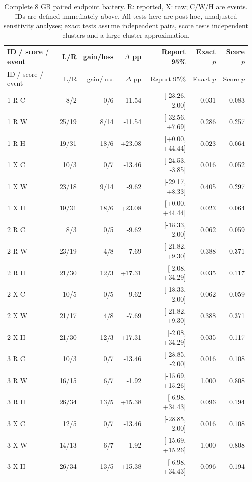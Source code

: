 \begin{longtable}{lrrrrrr}
\caption{Complete 8 GB paired endpoint battery. R: reported, X: raw; C/W/H are events. IDs are defined immediately above. All tests here are post-hoc, unadjusted sensitivity analyses; exact tests assume independent pairs, score tests independent clusters and a large-cluster approximation.}\label{tab:battery-tier8}\\
ID / score / event & L/R & gain/loss & $\Delta$ pp & Report 95\% & Exact $p$ & Score $p$\\\toprule\endfirsthead
ID / score / event & L/R & gain/loss & $\Delta$ pp & Report 95\% & Exact $p$ & Score $p$\\\toprule\endhead
1 R C & 8/2 & 0/6 & -11.54 & [-23.26, -2.00] & 0.031 & 0.083\\
1 R W & 25/19 & 8/14 & -11.54 & [-32.56, +7.69] & 0.286 & 0.257\\
1 R H & 19/31 & 18/6 & +23.08 & [+0.00, +44.44] & 0.023 & 0.064\\
1 X C & 10/3 & 0/7 & -13.46 & [-24.53, -3.85] & 0.016 & 0.052\\
1 X W & 23/18 & 9/14 & -9.62 & [-29.17, +8.33] & 0.405 & 0.297\\
1 X H & 19/31 & 18/6 & +23.08 & [+0.00, +44.44] & 0.023 & 0.064\\
2 R C & 8/3 & 0/5 & -9.62 & [-18.33, -2.00] & 0.062 & 0.059\\
2 R W & 23/19 & 4/8 & -7.69 & [-21.82, +9.30] & 0.388 & 0.371\\
2 R H & 21/30 & 12/3 & +17.31 & [-2.08, +34.29] & 0.035 & 0.117\\
2 X C & 10/5 & 0/5 & -9.62 & [-18.33, -2.00] & 0.062 & 0.059\\
2 X W & 21/17 & 4/8 & -7.69 & [-21.82, +9.30] & 0.388 & 0.371\\
2 X H & 21/30 & 12/3 & +17.31 & [-2.08, +34.29] & 0.035 & 0.117\\
3 R C & 10/3 & 0/7 & -13.46 & [-28.85, -2.00] & 0.016 & 0.108\\
3 R W & 16/15 & 6/7 & -1.92 & [-15.69, +15.26] & 1.000 & 0.808\\
3 R H & 26/34 & 13/5 & +15.38 & [-6.98, +34.43] & 0.096 & 0.194\\
3 X C & 12/5 & 0/7 & -13.46 & [-28.85, -2.00] & 0.016 & 0.108\\
3 X W & 14/13 & 6/7 & -1.92 & [-15.69, +15.26] & 1.000 & 0.808\\
3 X H & 26/34 & 13/5 & +15.38 & [-6.98, +34.43] & 0.096 & 0.194\\

\end{longtable}
